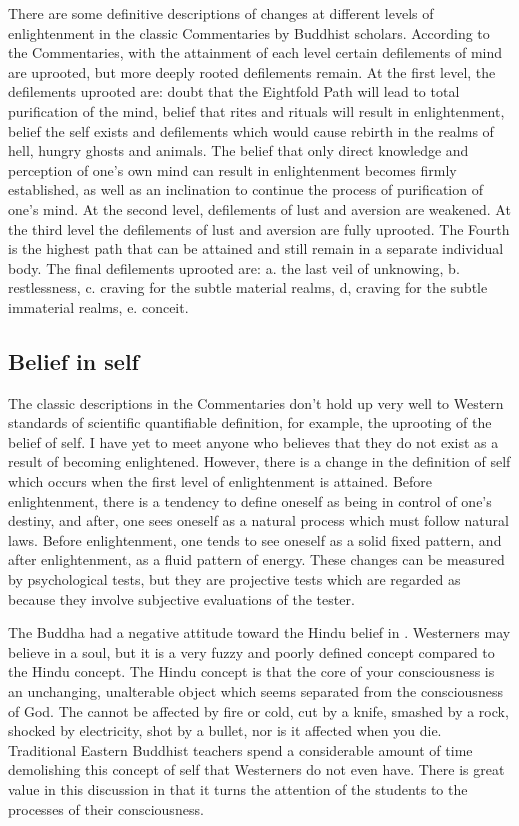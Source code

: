 \documentclass[a5paper,10pt,english]{book}
\begin{document}
\sphinxAtStartPar
There are some definitive descriptions of changes at different levels of
enlightenment in the classic Commentaries by Buddhist scholars.
According to the Commentaries, with the attainment of each level certain
defilements of mind are uprooted, but more deeply rooted defilements
remain. At the first level, the defilements uprooted are: doubt that the
Eightfold Path will lead to total purification of the mind, belief that
rites and rituals will result in enlightenment, belief the self exists
and defilements which would cause rebirth in the realms of hell, hungry
ghosts and animals. The belief that only direct knowledge and perception
of one’s own mind can result in enlightenment becomes firmly
established, as well as an inclination to continue the process of
purification of one’s mind. At the second level, defilements of lust and
aversion are weakened. At the third level the defilements of lust and
aversion are fully uprooted. The Fourth is the highest path that can be
attained and still remain in a separate individual body. The final
defilements uprooted are: a. the last veil of unknowing, b.
restlessness, c. craving for the subtle material realms, d, craving for
the subtle immaterial realms, e. conceit.


\subsection{Belief in self}
\label{\detokenize{saints:belief-in-self}}
\sphinxAtStartPar
The classic descriptions in the Commentaries don’t hold up very well to
Western standards of scientific quantifiable definition, for example,
the uprooting of the belief of self. I have yet to meet anyone who
believes that they do not exist as a result of becoming enlightened.
However, there is a change in the definition of self which occurs when
the first level of enlightenment is attained. Before enlightenment,
there is a tendency to define oneself as being in control of one’s
destiny, and after, one sees oneself as a natural process which must
follow natural laws. Before enlightenment, one tends to see oneself as a
solid fixed pattern, and after enlightenment, as a fluid pattern of
energy. These changes can be measured by psychological tests, but they
are projective tests which are regarded as  because they
involve subjective evaluations of the tester.

\sphinxAtStartPar
The Buddha had a negative attitude toward the Hindu belief in .
Westerners may believe in a soul, but it is a very fuzzy and poorly
defined concept compared to the Hindu concept. The Hindu concept is that
the core of your consciousness is an unchanging, unalterable object
which seems separated from the consciousness of God. The  cannot
be affected by fire or cold, cut by a knife, smashed by a rock, shocked
by electricity, shot by a bullet, nor is it affected when you die.
Traditional Eastern Buddhist teachers spend a considerable amount of
time demolishing this concept of self that Westerners do not even have.
There is great value in this discussion in that it turns the attention
of the students to the processes of their consciousness.
\end{document}
